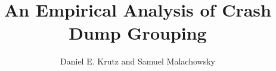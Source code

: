 \documentclass{llncs}
\begin{document}

\title{An Empirical Analysis of Crash Dump Grouping}
\author{Daniel E. Krutz and Samuel Malachowsky}



%


\maketitle
\end{document}

